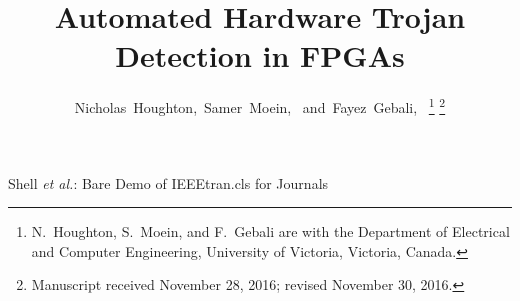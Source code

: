 \documentclass[journal, hidelinks]{IEEEtran}
\begin{document}
\DeclarePairedDelimiter\ceil{\lceil}{\rceil}
\DeclarePairedDelimiter\floor{\lfloor}{\rfloor}
%
\title{Automated Hardware Trojan Detection in FPGAs}
%
%
%

\author{Nicholas~Houghton,~Samer~Moein,~
	and~Fayez~Gebali,~%
	\thanks{N.~Houghton, S.~Moein, and F.~Gebali are with the Department
		of Electrical and Computer Engineering, University of Victoria, Victoria, Canada.}
	\thanks{Manuscript received November 28, 2016; revised November 30, 2016.}}

% 
%



%
{Shell \MakeLowercase{\textit{et al.}}: Bare Demo of IEEEtran.cls for Journals}
% 
\end{document}
